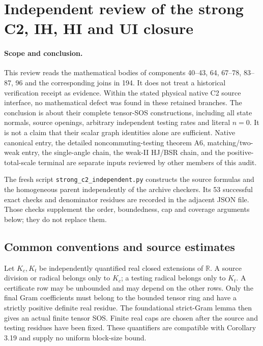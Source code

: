 \section{Independent review of the strong C2, IH, HI and UI closure}
\label{sec:independent-strong-c2-review}

\paragraph{Scope and conclusion.}
This review reads the mathematical bodies of components
40--43, 64, 67--78, 83--87, 96 and the corresponding joins in 194.
It does not treat a historical verification receipt as evidence.
Within the stated physical native C2 source interface, no mathematical
defect was found in these retained branches. The conclusion is about
their complete tensor-SOS constructions, including all state normals,
source openings, arbitrary independent testing rates and literal
$n=0$. It is not a claim that their scalar graph identities alone are
sufficient. Native canonical entry, the detailed noncommuting-testing
theorem A6, matching/two-weak entry, the single-angle chain, the weak-II
HJ/BSR chain, and the positive-total-scale terminal are separate inputs
reviewed by other members of this audit.

The fresh script \texttt{strong\_c2\_independent.py} constructs the
source formulas and the homogeneous parent independently of the archive
checkers. Its 53 successful exact checks and denominator residues are recorded in the
adjacent JSON file. Those checks supplement the order, boundedness,
cap and coverage arguments below; they do not replace them.

\subsection{Common conventions and source estimates}

Let $K_c,K_t$ be independently quantified real closed extensions of
$\mathbb R$. A source division or radical belongs only to $K_c$;
a testing radical belongs only to $K_t$. A certificate row may be
unbounded and may depend on the other rows. Only the final Gram
coefficients must belong to the bounded tensor ring and have a strictly
positive definite real residue. The foundational strict-Gram lemma then
gives an actual finite tensor SOS. Finite real caps are chosen after the
source and testing residues have been fixed. These quantifiers are
compatible with Corollary 3.19 and supply no uniform block-size bound.

